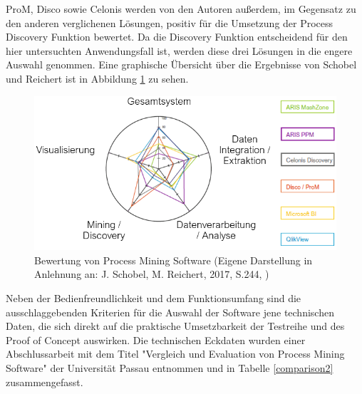 ProM, Disco sowie Celonis werden von den Autoren außerdem, im Gegensatz zu den anderen verglichenen Lösungen, positiv für die Umsetzung der Process Discovery Funktion bewertet. Da die Discovery Funktion entscheidend für den hier untersuchten Anwendungsfall ist, werden diese drei Lösungen in die engere Auswahl genommen.
Eine graphische Übersicht über die Ergebnisse von Schobel und Reichert ist in Abbildung \ref{fig:toolEval} zu sehen.
\begin{figure}[!ht]
    \centering
    \includegraphics[scale=0.6]{figures/Appbildungen/toolEval.PNG}
    \caption{Bewertung von Process Mining Software (Eigene Darstellung in Anlehnung an: J. Schobel, M. Reichert, 2017, S.244, \cite{Schobel2017})}
    \label{fig:toolEval}
\end{figure}
\newpage
Neben der Bedienfreundlichkeit und dem Funktionsumfang sind die ausschlaggebenden Kriterien für die Auswahl der Software jene technischen Daten, die sich direkt auf die praktische Umsetzbarkeit der Testreihe und des Proof of Concept auswirken. Die technischen Eckdaten wurden einer Abschlussarbeit mit dem Titel "Vergleich und Evaluation von Process Mining Software" der Universität Passau entnommen \cite{compPM} und in Tabelle \ref{comparison2} zusammengefasst.

